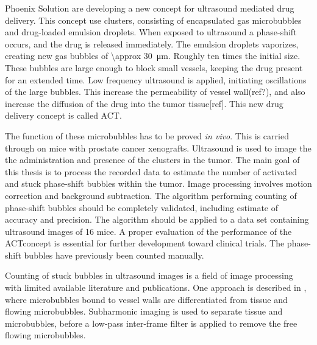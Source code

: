 Phoenix Solution are developing a new concept for ultrasound mediated drug delivery. This concept use clusters, consisting of encapsulated gas microbubbles and drug-loaded emulsion droplets. When exposed to ultrasound a phase-shift occurs, and the drug is released immediately. The emulsion droplets vaporizes, creating new gas bubbles of \SI{\approx 30}{\micro\meter}. Roughly ten times the initial size. These bubbles are large enough to block small vessels, keeping the drug present for an extended time. Low frequency ultrasound is applied, initiating oscillations of the large bubbles. This increase the permeability of vessel wall(ref?), and also increase the diffusion of the drug into the tumor tissue[ref]. This new drug delivery concept is called ACT\textregistered.

The function of these microbubbles has to be proved \textit{in vivo}. This is carried through on mice with prostate cancer xenografts. Ultrasound is used to image the the administration and presence of the clusters in the tumor. The main goal of this thesis is to process the recorded data to estimate the number of activated and stuck phase-shift bubbles within the tumor. Image processing involves motion correction and background subtraction. The algorithm performing counting of phase-shift bubbles should be completely validated, including estimate of accuracy and precision. The algorithm should be applied to a data set containing ultrasound images of 16 mice. A proper evaluation of the performance of the ACT\textregistered concept is essential for further development toward clinical trials. The phase-shift bubbles have previously been counted manually. 

Counting of stuck bubbles in ultrasound images is a field of image processing with limited available literature and publications. One approach is described in \cite{Needles2009}, where microbubbles bound to vessel walls are differentiated from tissue and flowing microbubbles. Subharmonic imaging is used to separate tissue and microbubbles, before a low-pass inter-frame filter is applied to remove the free flowing microbubbles. 













